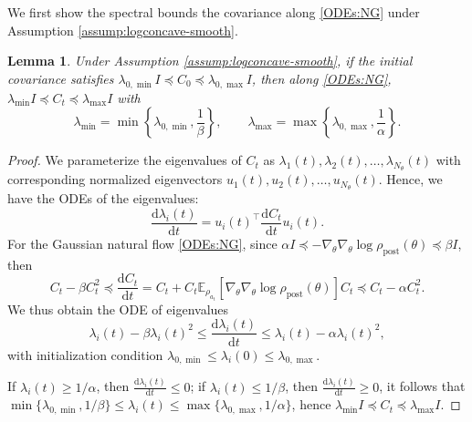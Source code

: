 \documentclass[11pt]{article}
\theoremstyle{plain}
\newtheorem{lemma}[theorem]{Lemma}
\theoremstyle{definition}
\theoremstyle{remark}
\newcommand{\E}{\mathbb{E}}
\newcommand{\post}{\mathrm{post}}
\newcommand{\dd}{\mathrm{d}}
\begin{document}
We first show the spectral bounds the covariance along \eqref{ODEs:NG} under Assumption \ref{assump:logconcave-smooth}.

\begin{lemma}\label{lem:cov-bound}
    Under Assumption \ref{assump:logconcave-smooth}, if the initial covariance satisfies $\lambda_{0, \min} I \preceq C_0 \preceq \lambda_{0, \max} I$, then along \eqref{ODEs:NG}, $\lambda_{\min} I \preceq C_t \preceq \lambda_{\max} I$ with 
    \begin{equation*}
        \lambda_{\min} = \min \left\{ \lambda_{0, \min}, \frac{1}{\beta} \right\}, \qquad \lambda_{\max} = \max \left\{ \lambda_{0, \max}, \frac{1}{\alpha} \right\}.
    \end{equation*}
\end{lemma}

\begin{proof}
    We parameterize the eigenvalues of $C_t$ as $\lambda_1 (t), \lambda_2 (t), \ldots, \lambda_{N_\theta} (t)$ with corresponding normalized eigenvectors $u_1 (t), u_2 (t), \ldots, u_{N_\theta} (t)$. Hence, we have the ODEs of the eigenvalues:
    \begin{equation*}
        \frac{\dd \lambda_i (t)}{\dd t} = u_i (t)^\top \frac{\dd C_t}{\dd t} u_i (t).
    \end{equation*}
    For the Gaussian natural flow \eqref{ODEs:NG}, since $\alpha I \preceq -\nabla_\theta \nabla_\theta \log \rho_\post (\theta) \preceq \beta I$, then 
    \begin{equation*}
        C_t - \beta C_t^2 \preceq \frac{\dd C_t}{\dd t} = C_t + C_t \E_{\rho_{a_t}} [\nabla_\theta \nabla_\theta \log \rho_\post (\theta)] C_t \preceq C_t - \alpha C_t^2.
    \end{equation*}
    We thus obtain the ODE of eigenvalues
    \begin{equation*}
        \lambda_i (t) - \beta \lambda_i (t)^2 \leq \frac{\dd \lambda_i(t)}{\dd t} \leq \lambda_i(t) - \alpha \lambda_i (t)^2, 
    \end{equation*}
    with initialization condition
    $\lambda_{0, \min} \leq \lambda_i(0) \leq \lambda_{0, \max}$. 

    If $\lambda_i (t) \geq 1/\alpha$, then $\frac{\dd \lambda_i(t)}{\dd t} \leq 0$; if $\lambda_i (t) \leq 1/\beta$, then $\frac{\dd \lambda_i(t)}{\dd t} \geq 0$, it follows that $\min \{ \lambda_{0, \min}, 1/\beta\} \leq \lambda_i(t) \leq \max \{\lambda_{0, \max}, 1/\alpha\}$, hence $\lambda_{\min} I \preceq C_t \preceq \lambda_{\max} I$.
\end{proof}
\end{document}
